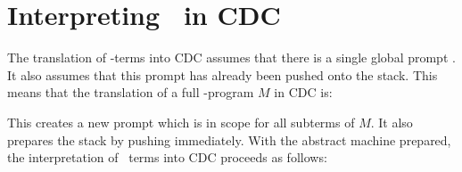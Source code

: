 
\section{Interpreting \lmu\ in CDC}\label{sec:lmu-in-cdc}



The translation of \lmu-terms into CDC assumes that there is a single global prompt \gp. 
It also assumes that this prompt has already been pushed onto the stack.
This means that the translation of a full \lmu-program $M$ in CDC is:

This creates a new prompt \gp which is in scope for all subterms of $M$.
It also prepares the stack by pushing \gp immediately. 
With the abstract machine prepared, 
the interpretation of \lmu\ terms into CDC proceeds as follows:


